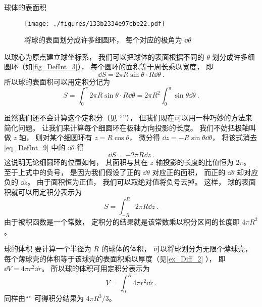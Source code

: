 \begin{example}{球体的表面积}\label{ex_DefInt_3}

\begin{figure}[ht]
\centering
\texttt{[image: ./figures/133b2334e97cbe22.pdf]}
\caption{将球的表面划分成许多细圆环， 每个对应的极角为 $\dd{\theta}$} \label{fig_DefInt_3}
\end{figure}

以球心为原点建立球坐标系， 我们可以把球体的表面根据不同的 $\theta$ 划分成许多细圆环（如\autoref{fig_DefInt_3}）， 每个圆环的面积等于周长乘以宽度， 即
\begin{equation}\label{eq_DefInt_9}
\dd{S} = 2\pi R\sin\theta \cdot R\dd{\theta}~.
\end{equation}
所以球的表面积可以用定积分记为
\begin{equation}
S = \int_0^{\pi} 2\pi R\sin\theta \cdot R\dd{\theta} = 2\pi R^2 \int_0^{\pi} \sin\theta \dd{\theta}~.
\end{equation}

虽然我们还不会计算这个定积分（见 “”）， 但我们现在可以用一种巧妙的方法来简化问题。 让我们来计算每个细圆环在极轴方向投影的长度。 我们不妨把极轴叫做 $z$ 轴， 则对某个细圆环有 $z = R\cos\theta$， 微分得 $\dd{z} = -R\sin\theta \dd{\theta}$， 将该式消去\autoref{eq_DefInt_9} 中的 $\dd{\theta}$ 得
\begin{equation}
\dd{S} = -2\pi R\dd{z}~.
\end{equation}
这说明无论细圆环的位置如何， 其面积与其在 $z$ 轴投影的长度的比值恒为 $2\pi$。 至于上式中的负号， 是因为我们假设了正的 $\dd{\theta}$ 对应正的面积， 而正的 $\dd{\theta}$ 却对应负的 $\dd{z}$。 由于面积恒为正值， 我们可以取绝对值将负号去掉。 这样， 球的表面积就可以用定积分表示为
\begin{equation}\label{eq_DefInt_12}
S = \int_{-R}^{R} 2\pi R\dd{z}~.
\end{equation}
由于被积函数是一个常数， 定积分的结果就是该常数乘以积分区间的长度即 $4\pi R^2$。
\end{example}

\begin{example}{球的体积}\label{ex_DefInt_4}
要计算一个半径为 $R$ 的球体的体积， 可以将球划分为无限个薄球壳， 每个薄球壳的体积等于该球壳的表面积乘以厚度（见\autoref{ex_Diff_2}  ）， 即 $\dd{V} = 4\pi r^2 \dd{r}$。 所以球的体积可用定积分表示为
\begin{equation}
V = \int_0^R 4\pi r^2 \dd{r}~.
\end{equation}
同样由“” 可得积分结果为 $4\pi R^3/3$。
\end{example}

